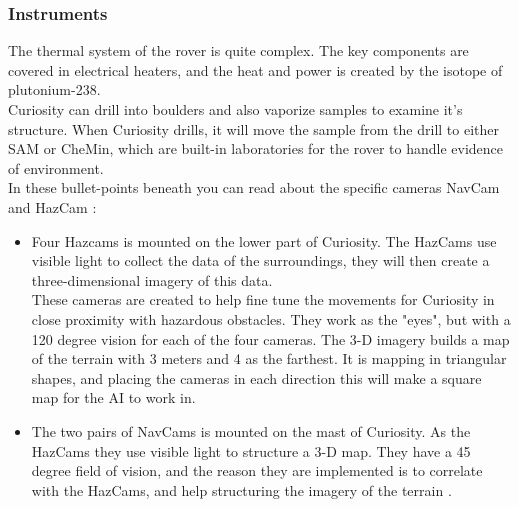 \subsubsection{Instruments}

The thermal system of the rover is quite complex. The key components are covered in electrical heaters, and the heat and power is created by the isotope of plutonium-238.\\
Curiosity can drill into boulders and also vaporize samples to examine it's structure. When Curiosity drills, it will move the sample from the drill to either SAM or CheMin, which are built-in laboratories for the rover to handle evidence of environment.\\
In these bullet-points beneath you can read about the specific cameras NavCam and HazCam \cite{CuriosityNASA}\cite{CuriosityPOWER}: 

\begin{itemize}
\item Four Hazcams is mounted on the lower part of Curiosity. The HazCams use visible light to collect the data of the surroundings, they will then create a three-dimensional imagery of this data.\\ These cameras are created to help fine tune the movements for Curiosity in close proximity with hazardous obstacles. They work as the "eyes", but with a 120 degree vision for each of the four cameras. The 3-D imagery builds a map of the terrain with 3 meters and 4 as the farthest. It is mapping in triangular shapes, and placing the cameras in each direction this will make a square map for the AI to work in\cite{CuriosityVision}. 
\item The two pairs of NavCams is mounted on the mast of Curiosity. As the HazCams they use visible light to structure a 3-D map. They have a 45 degree field of vision, and the reason they are implemented is to correlate with the HazCams, and help structuring the imagery of the terrain \cite{CuriosityVision}. 
\end{itemize}




